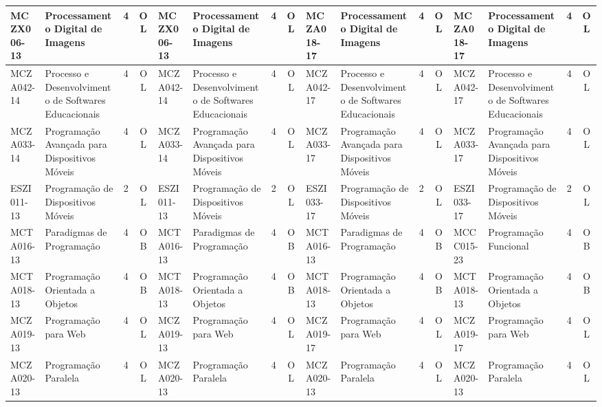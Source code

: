 \documentclass[a4paper]{article}
\begin{document}
\begin{landscape}
{\begin{longtable}{|l|p{.15\textheight}|c|c||l|p{.15\textheight}|c|c||l|p{.15\textheight}|c|c||l|p{.15\textheight}|c|c|}
    MCZX006-13 & Processamento Digital de Imagens & 4 & OL &
    MCZX006-13 & Processamento Digital de Imagens & 4 & OL &
    MCZA018-17 & Processamento Digital de Imagens & 4 & OL &
    MCZA018-17 & Processamento Digital de Imagens & 4 & OL \\ \hline
    
    MCZA042-14 & Processo e Desenvolvimento de Softwares Educacionais & 4 & OL &
    MCZA042-14 & Processo e Desenvolvimento de Softwares Educacionais & 4 & OL &
    MCZA042-17 & Processo e Desenvolvimento de Softwares Educacionais & 4 & OL & 
    MCZA042-17 & Processo e Desenvolvimento de Softwares Educacionais & 4 & OL \\ \hline
    
    MCZA033-14 & Programação Avançada para Dispositivos Móveis & 4 & OL &
    MCZA033-14 & Programação Avançada para Dispositivos Móveis & 4 & OL &
    MCZA033-17 & Programação Avançada para Dispositivos Móveis & 4 & OL & 
    MCZA033-17 & Programação Avançada para Dispositivos Móveis & 4 & OL \\ \hline
    
    ESZI011-13 & Programação de Dispositivos Móveis & 2 & OL &
    ESZI011-13 & Programação de Dispositivos Móveis & 2 & OL &
    ESZI033-17 & Programação de Dispositivos Móveis & 2 & OL &
    ESZI033-17 & Programação de Dispositivos Móveis & 2 & OL \\ \hline
    
    MCTA016-13 & Paradigmas de Programação & 4 & OB &
    MCTA016-13 & Paradigmas de Programação & 4 & OB &
    MCTA016-13 & Paradigmas de Programação & 4 & OB &
    MCCC015-23 & Programação Funcional     & 4 & OB\\ \hline

       
    MCTA018-13 & Programação Orientada a Objetos & 4 & OB &
    MCTA018-13 & Programação Orientada a Objetos & 4 & OB &
    MCTA018-13 & Programação Orientada a Objetos & 4 & OB &
    MCTA018-13 & Programação Orientada a Objetos & 4 & OB \\ \hline

    MCZA019-13 & Programação para Web & 4 & OL &
    MCZA019-13 & Programação para Web & 4 & OL &
    MCZA019-17 & Programação para Web & 4 & OL &
    MCZA019-17 & Programação para Web & 4 & OL \\ \hline
    
    MCZA020-13 & Programação Paralela & 4 & OL &
    MCZA020-13 & Programação Paralela & 4 & OL &
    MCZA020-13 & Programação Paralela & 4 & OL & 
    MCZA020-13 & Programação Paralela & 4 & OL \\ \hline
    

\end{longtable}}
\end{landscape}
\end{document}
